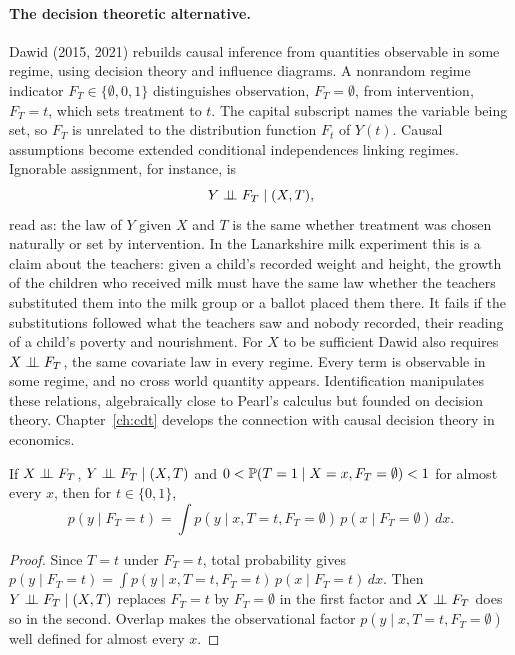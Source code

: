 \paragraph{The decision theoretic alternative.} Dawid (2015, 2021) rebuilds causal inference from quantities observable in some regime, using decision theory and influence diagrams. A nonrandom regime indicator $F_T\in\{\emptyset,0,1\}$ distinguishes observation, $F_T=\emptyset$, from intervention, $F_T=t$, which sets treatment to $t$. The capital subscript names the variable being set, so $F_T$ is unrelated to the distribution function $F_t$ of $Y(t)$. Causal assumptions become extended conditional independences linking regimes. Ignorable assignment, for instance, is
\[
Y \perp\!\!\!\perp F_T \mid (X, T),
\]
read as: the law of $Y$ given $X$ and $T$ is the same whether treatment was chosen naturally or set by intervention. In the Lanarkshire milk experiment this is a claim about the teachers: given a child's recorded weight and height, the growth of the children who received milk must have the same law whether the teachers substituted them into the milk group or a ballot placed them there. It fails if the substitutions followed what the teachers saw and nobody recorded, their reading of a child's poverty and nourishment. For $X$ to be sufficient Dawid also requires $X \perp\!\!\!\perp F_T$, the same covariate law in every regime. Every term is observable in some regime, and no cross world quantity appears. Identification manipulates these relations, algebraically close to Pearl's calculus but founded on decision theory. Chapter~\ref{ch:cdt} develops the connection with causal decision theory in economics.

\begin{proposition}\label{ss:prop:dawid}
If $X \perp\!\!\!\perp F_T$, $Y \perp\!\!\!\perp F_T \mid (X,T)$ and $0<\mathbb{P}(T=1\mid X=x,F_T=\emptyset)<1$ for almost every $x$, then for $t\in\{0,1\}$,
\[
p(y\mid F_T=t)=\int p(y\mid x,T=t,F_T=\emptyset)\,p(x\mid F_T=\emptyset)\,dx .
\]
\end{proposition}

\begin{proof}
Since $T=t$ under $F_T=t$, total probability gives $p(y\mid F_T=t)=\int p(y\mid x,T=t,F_T=t)\,p(x\mid F_T=t)\,dx$. Then $Y\perp\!\!\!\perp F_T\mid(X,T)$ replaces $F_T=t$ by $F_T=\emptyset$ in the first factor and $X\perp\!\!\!\perp F_T$ does so in the second. Overlap makes the observational factor $p(y\mid x,T=t,F_T=\emptyset)$ well defined for almost every $x$.
\end{proof}

